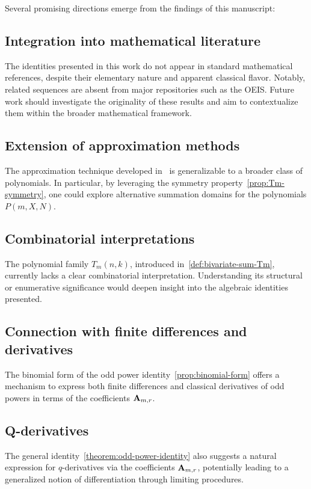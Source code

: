 Several promising directions emerge from the findings of this manuscript:

\subsection{Integration into mathematical literature}
\label{subsec:integration-into-mathematical-literature}
The identities presented in this work do not appear in standard mathematical references,
despite their elementary nature and apparent classical flavor.
Notably, related sequences are absent from major repositories such as the OEIS\@.
Future work should investigate the originality of these results and aim to contextualize
them within the broader mathematical framework.

\subsection{Extension of approximation methods}
\label{subsec:extension-of-approximation-methods}
The approximation technique developed in~\cite{kolosov2025efficient} is generalizable
to a broader class of polynomials.
In particular, by leveraging the symmetry property~\eqref{prop:Tm-symmetry},
one could explore alternative summation domains for the polynomials $P(m, X, N)$.

\subsection{Combinatorial interpretations}
\label{subsec:combinatorial-interpretations}
The polynomial family $T_m(n,k)$, introduced in~\eqref{def:bivariate-sum-Tm},
currently lacks a clear combinatorial interpretation.
Understanding its structural or enumerative significance would deepen insight into
the algebraic identities presented.

\subsection{Connection with finite differences and derivatives}
\label{subsec:connection-with-finite-differences-and-derivatives}
The binomial form of the odd power identity~\eqref{prop:binomial-form} offers a mechanism
to express both finite differences and classical derivatives of odd powers in terms
of the coefficients ${\mathbf{A}} \sb{m,r}$.

\subsection{Q-derivatives}
\label{subsec:q-derivative-representation}
The general identity~\eqref{theorem:odd-power-identity} also suggests a natural
expression for $q$-derivatives via the coefficients ${\mathbf{A}} \sb{m,r}$,
potentially leading to a generalized notion of differentiation through limiting procedures.


